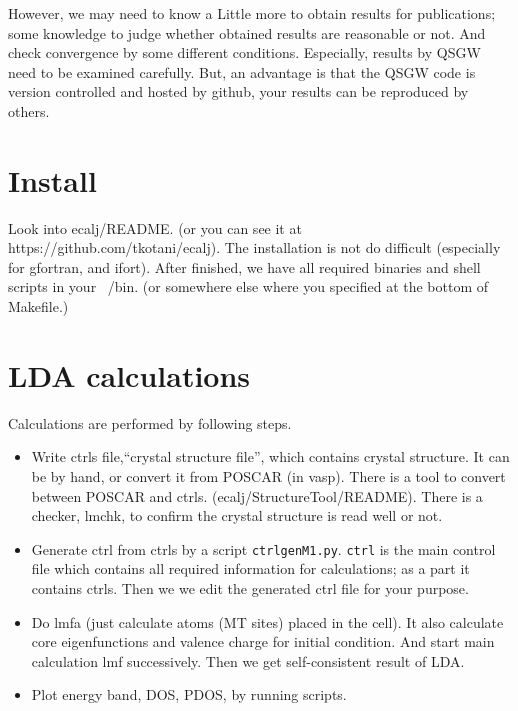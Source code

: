 \documentclass[a4paper,10pt,epsf,fleqn]{article}
\begin{document}
However, we may need to know a Little more to obtain results for publications;
some knowledge to judge whether obtained results 
are reasonable or not. And check convergence by some different conditions.
Especially, results by QSGW need to be examined carefully. 
But, an advantage is that the QSGW code is version controlled and hosted
by github, your results can be reproduced by others.


\section{Install}
\label{install}
Look into ecalj/README. (or you can see it at https://github.com/tkotani/ecalj).
The installation is not do difficult (especially for gfortran, and ifort). 
After finished, we have all required binaries and shell scripts in your
~/bin. (or somewhere else where you specified at the bottom of Makefile.)


\section{LDA calculations}
Calculations are performed by following steps.
\begin{itemize}
\item Write ctrls file,``crystal structure file'', which contains crystal structure.
  It can be by hand, or convert it from POSCAR (in vasp). There
  is a tool to convert between POSCAR and ctrls. (ecalj/StructureTool/README).
  There is a checker, lmchk, to confirm the crystal structure is read well or not.
\item Generate ctrl from ctrls by a script \verb+ctrlgenM1.py+. 
     \verb+ctrl+ is the main control file which contains all required
      information for calculations; as a part it contains ctrls.
      Then we we edit the generated ctrl file for your purpose.
\item Do lmfa (just calculate atoms (MT sites) placed in the cell). 
      It also calculate core eigenfunctions and valence charge for initial
      condition. And start main calculation lmf successively. 
      Then we get self-consistent result of LDA.
\item Plot energy band, DOS, PDOS, by running scripts.
\end{itemize}
\end{document}

